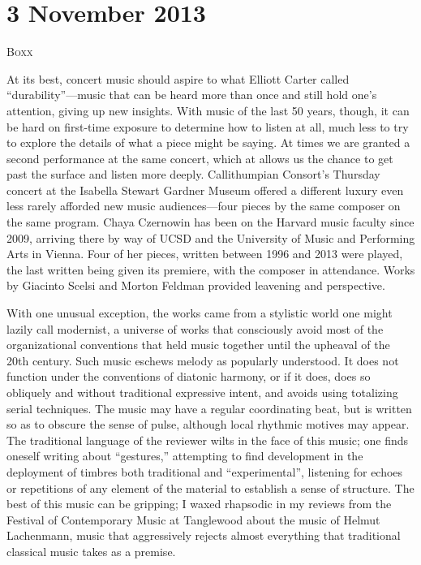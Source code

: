 \chapter{3 November 2013}

\textsc{Boxx}

At its best, concert music should aspire to what Elliott Carter called “durability”—music that can be heard more than once and still hold one’s attention, giving up new insights. With music of the last 50 years, though, it can be hard on first-time exposure to determine how to listen at all, much less to try to explore the details of what a piece might be saying. At times we are granted a second performance at the same concert, which at allows us the chance to get past the surface and listen more deeply. Callithumpian Consort’s Thursday concert at the Isabella Stewart Gardner Museum offered a different luxury even less rarely afforded new music audiences—four pieces by the same composer on the same program. Chaya Czernowin has been on the Harvard music faculty since 2009, arriving there by way of UCSD and the University of Music and Performing Arts in Vienna. Four of her pieces, written between 1996 and 2013 were played, the last written being given its premiere, with the composer in attendance. Works by Giacinto Scelsi and Morton Feldman provided leavening and perspective.

With one unusual exception, the works came from a stylistic world one might lazily call modernist, a universe of works that consciously avoid most of the organizational conventions that held music together until the upheaval of the 20th century. Such music eschews melody as popularly understood. It does not function under the conventions of diatonic harmony, or if it does, does so obliquely and without traditional expressive intent, and avoids using totalizing serial techniques. The music may have a regular coordinating beat, but is written so as to obscure the sense of pulse, although local rhythmic motives may appear. The traditional language of the reviewer wilts in the face of this music; one finds oneself writing about “gestures,” attempting to find development in the deployment of timbres both traditional and “experimental”, listening for echoes or repetitions of any element of the material to establish a sense of structure. The best of this music can be gripping; I waxed rhapsodic in my reviews from the Festival of Contemporary Music at Tanglewood about the music of Helmut Lachenmann, music that aggressively rejects almost everything that traditional classical music takes as a premise.

